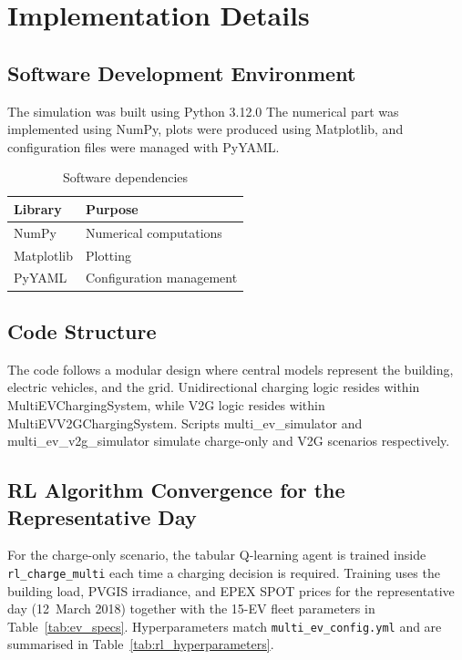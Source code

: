 \section{Implementation Details}\label{sec:implementation}

\subsection{Software Development Environment}

The simulation was built using Python 3.12.0 The numerical part was implemented using NumPy, plots were produced using Matplotlib, and configuration files were managed with PyYAML.

\begin{table}[h]
\centering
\caption{Software dependencies}
\label{tab:software}
\begin{tabular}{@{}ll@{}}
\toprule
\textbf{Library} & \textbf{Purpose} \\
\midrule
NumPy & Numerical computations \\
Matplotlib & Plotting \\
PyYAML & Configuration management \\
\bottomrule
\end{tabular}
\end{table}

\subsection{Code Structure}

The code follows a modular design where central models represent the building, electric vehicles, and the grid. Unidirectional charging logic resides within MultiEVChargingSystem, while V2G logic resides within MultiEVV2GChargingSystem. Scripts multi\_ev\_simulator and multi\_ev\_v2g\_simulator simulate charge-only and V2G scenarios respectively.

\subsection{RL Algorithm Convergence for the Representative Day}
\label{subsec:rl_convergence}

For the charge-only scenario, the tabular Q-learning agent is trained inside \texttt{rl\_charge\_multi} each time a charging decision is required. Training uses the building load, PVGIS irradiance, and EPEX SPOT prices for the representative day (12~March 2018) together with the 15-EV fleet parameters in Table~\ref{tab:ev_specs}. Hyperparameters match \texttt{multi\_ev\_config.yml} and are summarised in Table~\ref{tab:rl_hyperparameters}.

